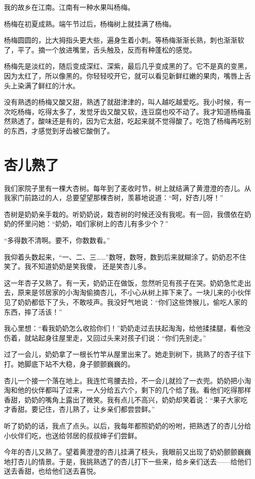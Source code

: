 \documentclass[12pt,UTF-8,openany]{ctexbook}
\begin{document}
\begin{Large}
    
    我的故乡在江南。江南有一种水果叫杨梅。
    
    杨梅在初夏成熟。端午节过后，杨梅树上就挂满了杨梅。
    
    杨梅圆圆的，比大拇指头更大些，遍身生着小刺。等杨梅渐渐长熟，刺也渐渐软了，平了。摘一个放进嘴里，舌头触及，反而有种蓬松的感觉。
    
    杨梅先是淡红的，随后变成深红、深紫，最后几乎变成黑的了。它不是真的变黑，因为太红了，所以像黑的。你轻轻咬开它，就可以看见新鲜红嫩的果肉，嘴唇上舌头上染满了鲜红的汁水。
    
    没有熟透的杨梅又酸又甜，熟透了就甜津津的，叫人越吃越爱吃。我小时候，有一次吃杨梅，吃得太多了，发觉牙齿又酸又软，连豆腐也咬不动了。我才知道杨梅虽然熟透了，酸味还是有的，因为它太甜，吃起来就不觉得酸了。吃饱了杨梅再吃别的东西，才感觉到牙齿被它酸倒了。
    
\end{Large}

\chapter{杏儿熟了}

\begin{Large}
    
    我们家院子里有一棵大杏树。每年到了麦收时节，树上就结满了黄澄澄的杏儿。从我家门前路过的人，总要望望那棵杏树，羡慕地说道：“呵，好杏儿呀！”
    
    杏树是奶奶亲手栽的。听奶奶说，栽杏树的时候还没有我呢。有一回，我偎依在奶奶的怀里问她：“奶奶，咱们家树上的杏儿有多少个？”
    
    “多得数不清啊。要不，你数数看。”
    
    我仰着头数起来，“一、二、三……”数呀，数呀，数到后来就糊涂了。奶奶忍不住笑了。我不知道奶奶是笑我傻， 还是笑杏儿多。
    
    这一年杏子又熟了。有一天，奶奶正在做饭，忽然听见有孩子在哭。奶奶急忙走出去，原来是邻居家的小淘淘偷摘杏儿，不小心从树上摔下来了。一块儿来的小伙伴见了奶奶都低下了头，不敢吱声。我没好气地说：“你们这些馋猴儿，偷吃人家的东西，摔了活该！”
    
    我心里想：“看我奶奶怎么收拾你们！”奶奶走过去扶起淘淘，给他揉揉腿，看他没伤着，就站起身往屋里走，又回过头来对孩子们说：“你们先别走。”
    
    过了一会儿，奶奶拿了一根长竹竿从屋里出来了。她走到树下，挑熟了的杏子往下打。她脚底下站不大稳，身子颤颤巍巍的。
    
    杏儿一个接一个落在地上。我连忙弯腰去捡，不一会儿就捡了一衣兜。奶奶把小淘淘和他的伙伴都叫了过来，一人分给五六个，剩下的几个给了我。看他们吃得那样香甜，奶奶的嘴角上露出了微笑。我有点儿不高兴，奶奶却笑着说：“果子大家吃才香甜。要记住，杏儿熟了，让乡亲们都尝尝鲜。''
    
    听了奶奶的话，我点了点头。以后，我每年都照奶奶的吩咐，把熟透了的杏儿分给小伙伴们吃，也送给邻居的叔叔婶子们尝鲜。
    
    今年的杏儿又熟了。望着黄澄澄的杏儿挂满了枝头，我眼前又出现了奶奶颤颤巍巍地打杏儿的情景。于是，我挑熟透了的杏儿打下一些来，给乡亲们送去——给他们送去香甜，也给他们送去喜悦。
    
\end{Large}
\end{document}
